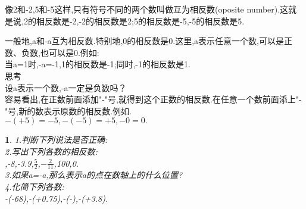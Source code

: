 \documentclass{article}
\newtheorem{exercise}{ }
\begin{document}
	\begin{defintion}
	像2和-2,5和-5这样,只有符号不同的两个数叫做互为相反数(oposite number).这就是说,2的相反数是-2,-2的相反数是2;5的相反数是-5,-5的相反数是5.\\
	\end{defintion}
	
	\indent 一般地,a和-a互为相反数.特别地,0的相反数是0.这里,a表示任意一个数,可以是正数、负数,也可以是0.例如:\\
	\indent 当a=1时,-a=-1,1的相反数是-1;同时,-1的相反数是1.\\
	思考\\
	\indent 设a表示一个数,-a一定是负数吗？\\
	\indent 容易看出,在正数前面添加"-"号,就得到这个正数的相反数.在任意一个数前面添上"-"号,新的数表示原数的相反数.例如.\\
	\indent $-(+5)=-5, -(-5)=+5, -0=0.$\\
	\begin{exercise}
		1.判断下列说法是否正确:\\	
		\newcommand{\fourch}[4]{
			\indent\makebox[262pt][l]{\qquad(A) #1}\\
			\indent\makebox[262pt][l]{\qquad(B) #2}\\
			\indent\makebox[262pt][l]{\qquad(C) #3}\\
			\indent\makebox[262pt][l]{\qquad(D) #4}\\}
		2.写出下列各数的相反数:\\
		,-8,-3.9,$\frac{5}{2}$,$-\frac{2}{11}$,100,0.\\
		3.如果a=-a,那么表示a的点在数轴上的什么位置?\\
		4.化简下列各数:\\
		\indent -(-68),-(+0.75),-(-),-(+3.8).\\
	\end{exercise}	
\end{document}
